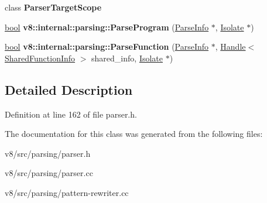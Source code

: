 \begin{DoxyCompactItemize}
class {\bfseries Parser\+Target\+Scope}
\item 
\mbox{\label{classv8_1_1internal_1_1Parser_a925203dd2ac2ec2a777f34fbfeb6f1a7}} 
\mbox{\hyperlink{classbool}{bool}} {\bfseries v8\+::internal\+::parsing\+::\+Parse\+Program} (\mbox{\hyperlink{classv8_1_1internal_1_1ParseInfo}{Parse\+Info}} $\ast$, \mbox{\hyperlink{classv8_1_1internal_1_1Isolate}{Isolate}} $\ast$)
\item 
\mbox{\label{classv8_1_1internal_1_1Parser_a818b4960703afdde42bfa842a3fe60f5}} 
\mbox{\hyperlink{classbool}{bool}} {\bfseries v8\+::internal\+::parsing\+::\+Parse\+Function} (\mbox{\hyperlink{classv8_1_1internal_1_1ParseInfo}{Parse\+Info}} $\ast$, \mbox{\hyperlink{classv8_1_1internal_1_1Handle}{Handle}}$<$ \mbox{\hyperlink{classv8_1_1internal_1_1SharedFunctionInfo}{Shared\+Function\+Info}} $>$ shared\+\_\+info, \mbox{\hyperlink{classv8_1_1internal_1_1Isolate}{Isolate}} $\ast$)
\end{DoxyCompactItemize}


\subsection{Detailed Description}


Definition at line 162 of file parser.\+h.



The documentation for this class was generated from the following files\+:\begin{DoxyCompactItemize}
\item 
v8/src/parsing/parser.\+h\item 
v8/src/parsing/parser.\+cc\item 
v8/src/parsing/pattern-\/rewriter.\+cc\end{DoxyCompactItemize}
